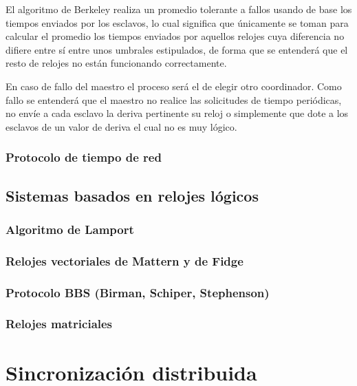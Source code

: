 \documentclass[a4paper, 11pt, titlepage]{article}
\begin{document}
            El algoritmo de Berkeley realiza un promedio tolerante a fallos usando de base los tiempos 
            enviados por los esclavos, lo cual significa que únicamente se toman para calcular el promedio 
            los tiempos enviados por aquellos relojes cuya diferencia no difiere entre sí entre unos 
            umbrales estipulados, de forma que se entenderá que el resto de relojes no están funcionando 
            correctamente.

            En caso de fallo del maestro el proceso será el de elegir otro coordinador. Como fallo se 
            entenderá que el maestro no realice las solicitudes de tiempo periódicas, no envíe a cada 
            esclavo la deriva pertinente su reloj o simplemente que dote a los esclavos de un valor de 
            deriva el cual no es muy lógico. 

        \subsubsection{Protocolo de tiempo de red}

    \subsection{Sistemas basados en relojes lógicos}

        \subsubsection{Algoritmo de Lamport}

        \subsubsection{Relojes vectoriales de Mattern y de Fidge}

        \subsubsection{Protocolo BBS (Birman, Schiper, Stephenson)}

        \subsubsection{Relojes matriciales}

\section{Sincronización distribuida}
\end{document}
